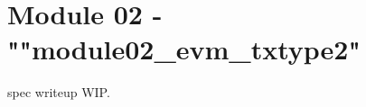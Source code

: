 \newpage
\section{Module 02 - {\ttfamily ""module02\_evm\_txtype2"}}
\label{sec:module02_predicate}

spec writeup WIP.

